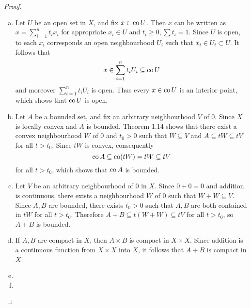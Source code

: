 \begin{proof} 
	\begin{enumerate}[(a)]
		\item Let $U$ be an open set in $X$, and fix $x \in \operatorname{co} U$. Then $x$ can be written as $x = \sum_{i=1}^n t_i x_i$ for appropriate $x_i \in U$ and $t_i \ge 0, \sum t_i = 1$. Since $U$ is open, to each $x_i$ corresponds an open neighbourhood $U_i$ such that $x_i \in U_i \subset U$. It follows that
		\begin{equation*}
			x \in \sum_{i=1}^n t_i U_i \subseteq \operatorname{co} U
		\end{equation*}
		and moreover $\sum_{i=1}^n t_i U_i$ is open. Thus every $x \in \operatorname{co} U$ is an interior point, which shows that $\operatorname{co} U$ is open.
		
		\item Let $A$ be a bounded set, and fix an arbitrary neighbourhood $V$ of 0. Since $X$ is locally convex and $A$ is bounded, Theorem 1.14 shows that there exist a convex neighbourhood $W$ of 0 and $t_0>0$ such that $W \subseteq V$ and $A \subseteq tW \subseteq tV$ for all $t>t_0$. Since $tW$ is convex, consequently
		\begin{equation*}
			\operatorname{co} A \subseteq \operatorname{co}(tW) = tW \subseteq tV
		\end{equation*}
		for all $t>t_0$, which shows that $\operatorname{co} A$ is bounded.
		
		\item Let $V$ be an arbitrary neighbourhood of 0 in $X$. Since $0+0=0$ and addition is continuous, there exists a neighbourhood $W$ of 0 such that $W+W \subseteq V$. Since $A, B$ are bounded, there exists $t_0>0$ such that $A, B$ are both contained in $tW$ for all $t>t_0$. Therefore $A+B \subseteq t(W+W) \subseteq tV$ for all $t>t_0$, so $A+B$ is bounded.
		
		\item If $A, B$ are compact in $X$, then $A \times B$ is compact in $X \times X$. Since addition is a continuous function from $X \times X$ into $X$, it follows that $A+B$ is compact in $X$.
		
		\item
		
		\item
	\end{enumerate}
\end{proof}